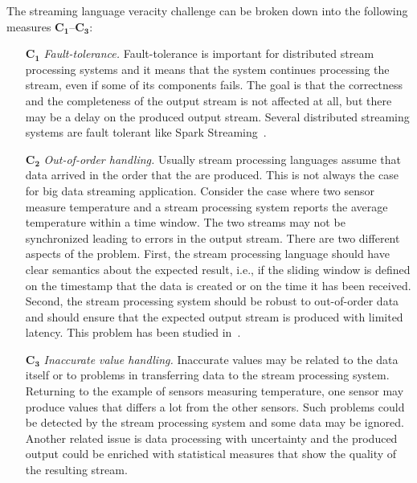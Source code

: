 The streaming language veracity challenge can be broken down
into the following measures $\mathbf{C_1}$--$\mathbf{C_3}$:

\begin{itemize}
  \item[$\mathbf{C_1}$] \emph{Fault-tolerance.} Fault-tolerance is important for distributed stream processing systems and it means that the system continues processing the stream, even if some of its components fails. The goal is that the correctness and the completeness of the output stream is not affected at all, but there may be a delay on the produced output stream. Several distributed streaming systems are fault tolerant like Spark Streaming~\cite{zaharia_et_al_2013}.
  \item[$\mathbf{C_2}$] \emph{Out-of-order handling.} Usually stream processing languages assume that data arrived in the order that the are produced. This is not always the case for big data streaming application. Consider the case where two sensor measure temperature and a stream processing system reports the average temperature within a time window. The two streams may not be synchronized leading to errors in the output stream. There are two different aspects of the problem. First, the stream processing language should have clear semantics about the expected result, i.e., if the sliding window is defined on the timestamp that the data is created or on the time it has been received. Second, the stream processing system should be robust to out-of-order data and should ensure that the expected output stream is produced with limited latency. This problem has been studied in~\cite{Li:2008:OPN:1453856.1453890}.
	
  \item[$\mathbf{C_3}$] \emph{Inaccurate value handling.} Inaccurate values may be related to the data itself or to problems in transferring data to the stream processing system. Returning to the example of sensors measuring temperature, one sensor may produce values that differs a lot from the other sensors. Such problems could be detected by the stream processing system and some data may be ignored. Another related issue is data processing with uncertainty and the produced output could be enriched with statistical measures that show the quality of the resulting stream.
    
\end{itemize}

